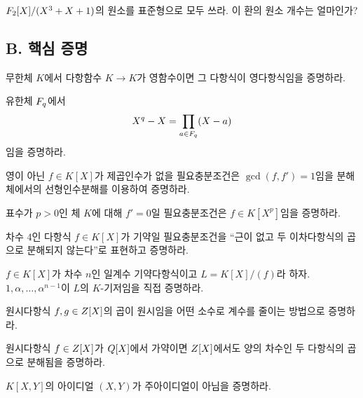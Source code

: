 \begin{exercise}
$F_2[X]/(X^3+X+1)$의 원소를 표준형으로 모두 쓰라. 이 환의 원소 개수는 얼마인가?
\end{exercise}

\subsection*{B. 핵심 증명}

\begin{exercise}
무한체 $K$에서 다항함수 $K\to K$가 영함수이면 그 다항식이 영다항식임을 증명하라.
\end{exercise}

\begin{exercise}[*]
유한체 $F_q$에서
\[
  X^q-X=\prod_{a\in F_q}(X-a)
\]
임을 증명하라.
\end{exercise}

\begin{exercise}
영이 아닌 $f\in K[X]$가 제곱인수가 없을 필요충분조건은 $\gcd(f,f')=1$임을 분해체에서의 선형인수분해를 이용하여 증명하라.
\end{exercise}

\begin{exercise}[*]
표수가 $p>0$인 체 $K$에 대해 $f'=0$일 필요충분조건은 $f\in K[X^p]$임을 증명하라.
\end{exercise}

\begin{exercise}
차수 $4$인 다항식 $f\in K[X]$가 기약일 필요충분조건을 ``근이 없고 두 이차다항식의 곱으로 분해되지 않는다''로 표현하고 증명하라.
\end{exercise}

\begin{exercise}[*]
$f\in K[X]$가 차수 $n$인 일계수 기약다항식이고 $L=K[X]/(f)$라 하자. $1,\alpha,\dots,\alpha^{n-1}$이 $L$의 $K$-기저임을 직접 증명하라.
\end{exercise}

\begin{exercise}
원시다항식 $f,g\in Z[X]$의 곱이 원시임을 어떤 소수로 계수를 줄이는 방법으로 증명하라.
\end{exercise}

\begin{exercise}[*]
원시다항식 $f\in Z[X]$가 $Q[X]$에서 가약이면 $Z[X]$에서도 양의 차수인 두 다항식의 곱으로 분해됨을 증명하라.
\end{exercise}

\begin{exercise}
$K[X,Y]$의 아이디얼 $(X,Y)$가 주아이디얼이 아님을 증명하라.
\end{exercise}

